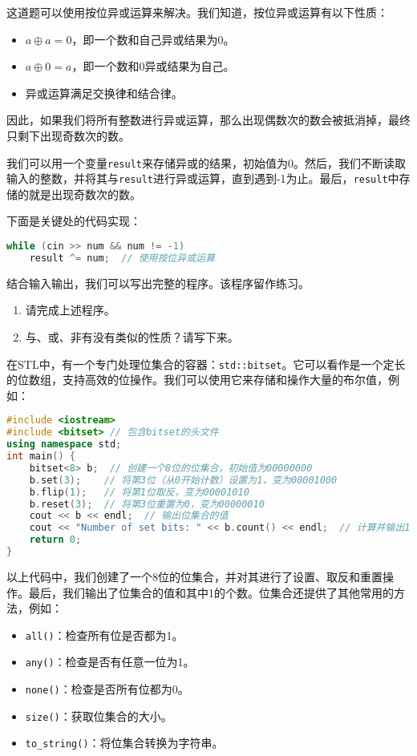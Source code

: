 \begin{answer}
    这道题可以使用按位异或运算来解决。我们知道，按位异或运算有以下性质：
    \begin{itemize}
        \item $a \oplus a = 0$，即一个数和自己异或结果为0。
        \item $a \oplus 0 = a$，即一个数和0异或结果为自己。
        \item 异或运算满足交换律和结合律。
    \end{itemize}
    因此，如果我们将所有整数进行异或运算，那么出现偶数次的数会被抵消掉，最终只剩下出现奇数次的数。

    我们可以用一个变量\texttt{result}来存储异或的结果，初始值为0。然后，我们不断读取输入的整数，并将其与\texttt{result}进行异或运算，直到遇到-1为止。最后，\texttt{result}中存储的就是出现奇数次的数。

    下面是关键处的代码实现：
\begin{lstlisting}[language=C++]
while (cin >> num && num != -1)
    result ^= num;  // 使用按位异或运算
\end{lstlisting}
    结合输入输出，我们可以写出完整的程序。该程序留作练习。
\end{answer}

\begin{exercise}
    \begin{enumerate}
        \item 请完成上述程序。
        \item 与、或、非有没有类似的性质？请写下来。
    \end{enumerate}
\end{exercise}

在STL中，有一个专门处理位集合的容器：\texttt{std::bitset}。它可以看作是一个定长的位数组，支持高效的位操作。我们可以使用它来存储和操作大量的布尔值，例如：
\begin{lstlisting}[language=C++]
#include <iostream>
#include <bitset> // 包含bitset的头文件
using namespace std;
int main() {
    bitset<8> b;  // 创建一个8位的位集合，初始值为00000000
    b.set(3);    // 将第3位（从0开始计数）设置为1，变为00001000
    b.flip(1);   // 将第1位取反，变为00001010
    b.reset(3);  // 将第3位重置为0，变为00000010
    cout << b << endl;  // 输出位集合的值
    cout << "Number of set bits: " << b.count() << endl;  // 计算并输出1的个数
    return 0;
}
\end{lstlisting}
以上代码中，我们创建了一个8位的位集合，并对其进行了设置、取反和重置操作。最后，我们输出了位集合的值和其中1的个数。位集合还提供了其他常用的方法，例如：
\begin{itemize}
  \item \texttt{all()}：检查所有位是否都为1。
  \item \texttt{any()}：检查是否有任意一位为1。
  \item \texttt{none()}：检查是否所有位都为0。
  \item \texttt{size()}：获取位集合的大小。
  \item \texttt{to\_string()}：将位集合转换为字符串。
\end{itemize}

